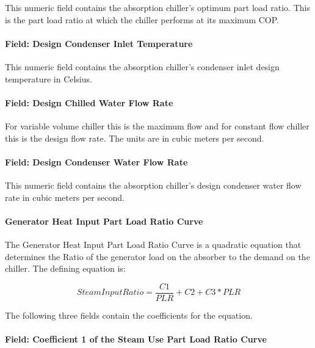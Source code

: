 This numeric field contains the absorption chiller's optimum part load ratio. This is the part load ratio at which the chiller performs at its maximum COP.

\paragraph{Field: Design Condenser Inlet Temperature}\label{field-design-condenser-inlet-temperature}

This numeric field contains the absorption chiller's condenser inlet design temperature in Celsius.

\paragraph{Field: Design Chilled Water Flow Rate}\label{field-design-chilled-water-flow-rate}

For variable volume chiller this is the maximum flow and for constant flow chiller this is the design flow rate. The units are in cubic meters per second.

\paragraph{Field: Design Condenser Water Flow Rate}\label{field-design-condenser-water-flow-rate}

This numeric field contains the absorption chiller's design condenser water flow rate in cubic meters per second.

\paragraph{Generator Heat Input Part Load Ratio Curve}\label{generator-heat-input-part-load-ratio-curve}

The Generator Heat Input Part Load Ratio Curve is a quadratic equation that determines the Ratio of the generator load on the absorber to the demand on the chiller. The defining equation is:

\begin{equation}
    SteamInputRatio = \frac{{C1}}{{PLR}} + C2 + C3 * PLR
\end{equation}

The following three fields contain the coefficients for the equation.

\paragraph{Field: Coefficient 1 of the Steam Use Part Load Ratio Curve}\label{field-coefficient-1-of-the-steam-use-part-load-ratio-curve}

